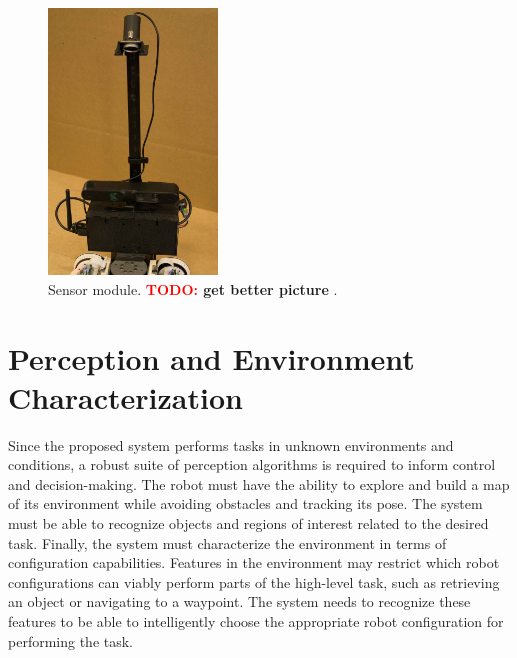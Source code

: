 \documentclass[conference]{IEEEtran}
\newcommand{\TODO}[1]{ {\bf \textcolor{red}{TODO:} #1 }}
\begin{document}
\begin{figure}
\begin{center}
\includegraphics[width=0.4\textwidth]{images/sensor_module.jpg}
\caption{Sensor module. \TODO{get better picture}.}
\label{fig:sensor-module}
\end{center}
\end{figure}

%
%

\section{Perception and Environment Characterization}
\label{sec:perception-and-env-characterization}
%
Since the proposed system performs tasks in unknown environments and conditions, a robust suite of perception algorithms is required to inform control and decision-making. The robot must have the ability to explore and build a map of its environment while avoiding obstacles and tracking its pose. The system must be able to recognize objects and regions of interest related to the desired task. Finally, the system must characterize the environment in terms of configuration capabilities. Features in the environment may restrict which robot configurations can viably perform parts of the high-level task, such as retrieving an object or navigating to a waypoint. The system needs to recognize these features to be able to intelligently choose the appropriate robot configuration for performing the task.
\end{document}
